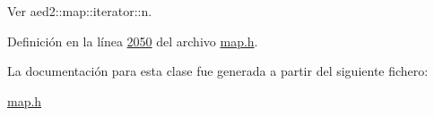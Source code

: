 \-Ver aed2\-::map\-::iterator\-::n. 



\-Definición en la línea \hyperlink{map_8h_source_l02050}{2050} del archivo \hyperlink{map_8h_source}{map.\-h}.



\-La documentación para esta clase fue generada a partir del siguiente fichero\-:\begin{DoxyCompactItemize}
\item 
\hyperlink{map_8h}{map.\-h}\end{DoxyCompactItemize}
